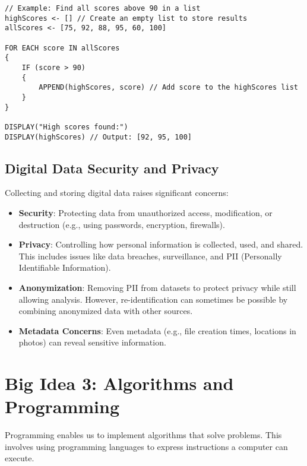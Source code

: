 \documentclass[11pt,oneside]{book}
\begin{document}
\begin{lstlisting}[language={}, label={lst:data_filtering_example}, caption={AP Pseudocode: Filtering Data in a List}]
// Example: Find all scores above 90 in a list
highScores <- [] // Create an empty list to store results
allScores <- [75, 92, 88, 95, 60, 100]

FOR EACH score IN allScores
{
    IF (score > 90)
    {
        APPEND(highScores, score) // Add score to the highScores list
    }
}

DISPLAY("High scores found:")
DISPLAY(highScores) // Output: [92, 95, 100]
\end{lstlisting}

\section{Digital Data Security and Privacy}
\label{sec:data_security_privacy}
Collecting and storing digital data raises significant concerns:
\begin{itemize}
    \item \textbf{Security}: Protecting data from unauthorized access, modification, or destruction (e.g., using passwords, encryption, firewalls).
    \item \textbf{Privacy}: Controlling how personal information is collected, used, and shared. This includes issues like data breaches, surveillance, and PII (Personally Identifiable Information).
    \item \textbf{Anonymization}: Removing PII from datasets to protect privacy while still allowing analysis. However, re-identification can sometimes be possible by combining anonymized data with other sources.
    \item \textbf{Metadata Concerns}: Even metadata (e.g., file creation times, locations in photos) can reveal sensitive information.
\end{itemize}

\chapter{Big Idea 3: Algorithms and Programming}
\label{chap:algorithms_programming}
Programming enables us to implement algorithms that solve problems. This involves using programming languages to express instructions a computer can execute.
\end{document}
